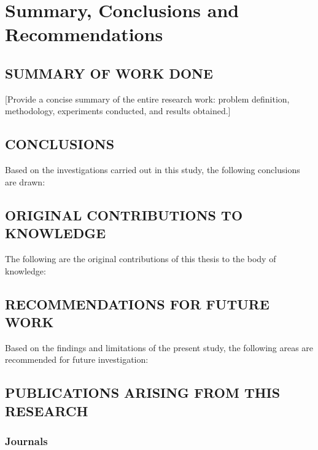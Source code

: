 

\chapter{Summary, Conclusions and Recommendations}

\section{SUMMARY OF WORK DONE}

[Provide a concise summary of the entire research work:
problem definition, methodology, experiments conducted,
and results obtained.]

\section{CONCLUSIONS}

Based on the investigations carried out in this study, the following
conclusions are drawn:

\section{ORIGINAL CONTRIBUTIONS TO KNOWLEDGE}

The following are the original contributions of this thesis to
the body of knowledge:

\section{RECOMMENDATIONS FOR FUTURE WORK}

Based on the findings and limitations of the present study, the
following areas are recommended for future investigation:

\section{PUBLICATIONS ARISING FROM THIS RESEARCH}

\subsection{Journals}

